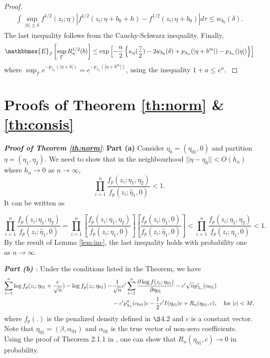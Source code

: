 \documentclass[11pt]{statsoc}
\begin{document}
\begin{proof}
\begin{align}
\int \sup_{|h|\leq \delta} f^{1/2}(z_i;\eta)| f^{1/2}(z_i;\eta+b_0+h)-f^{1/2}(z_i;\eta+b_0)    |d\tau \leq w_{b_0}(\delta).
\label{eq:lemproof2}
\end{align}
The last inequality follows from the Cauchy-Schwarz inequality.
Finally,
\begin{align*} {\mathbbmss{E}}_{\beta} \left[ \sup_{\Gamma}R_n^{1/2}(b) \right] \leq
\exp\left[-\frac{n}{2}\left\{ \kappa_{\eta}(\frac{\gamma}{2})-2w_{b_0}(\delta)
+p_{\lambda_n}(|\eta+b^m|)-p_{\lambda_n}(|\eta|)\right\} \right]
\end{align*}
where $\sup_{\Gamma} e^{- p_{\lambda_n}(|\eta+b|)}=
e^{-p_{\lambda_n}(|\eta+b^m|)}$, using the inequality $1+a \leq e^a$. {\nobreak \ifvmode \relax \else
      \ifdim\lastskip<1.5em \hskip-\lastskip
      \hskip1.5em plus0em minus0.5em \fi \nobreak
      \vrule height0.75em width0.5em depth0.25em\fi}
\end{proof}

\section{Proofs of Theorem \ref{th:norm} \& \ref{th:consis} }
\textbf{\it{Proof of Theorem \ref{th:norm}}}: 
\textbf{Part (a)} Consider $\eta_0=(\eta_{01},0)$ and partition $\eta=(\eta_1,\eta_2)$. We need to show that in the neighbourhood $||\eta-\eta_0||<O( h_n)$ where $h_n \rightarrow 0$ as $n \rightarrow \infty$,
\[
\prod_{i=1}^n \frac{f_p(z_i;\eta_1,\eta_2)}{f_p(z_i;\widehat \eta_1,0)} <1.
\]
It can be written as

\[
\prod_{i=1}^n \frac{f_p(z_i;\eta_1,\eta_2)}{f_p(z_i;\widehat \eta_1,0)} = \prod_{i=1}^n \left[\frac{f_p(z_i;\eta_1,\eta_2)}{f_p(z_i; \eta_1,0)} \right]\left[\frac{f_p(z_i;\eta_1,0)}{f_p(z_i;\widehat \eta_1,0)} \right]<\prod_{i=1}^n \frac{f_p(z_i;\eta_1,\eta_2)}{f_p(z_i; \eta_1,0)} <1.
\]
By the result of Lemma \ref{lem:inc}, the last inequality holds with
probability one as $n \rightarrow \infty$.

\textbf{\it{Part (b) }}: Under the conditions listed in the Theorem, we have
\begin{align*}
\sum_{i=1}^n \log f_p(z_i; \eta_{01}+\frac{c}{\sqrt n}) - \log f_p(z_i; \eta_{01}) =& \frac{1}{\sqrt n}  c' \sum_{i=1}^n \frac{\partial \log f(z_i; \eta_{01})}{\partial \eta_{01}} - c' \sqrt np'_{\lambda_n}(\alpha_{01}) \\
&-c' p''_{\lambda_n}(\alpha_{01}) c     - \frac{1}{2} c'I(\eta_{01})c + R_n(\eta_{01},c), \hspace{.1in} \text{ for $|c|<M$},
\end{align*}
where $f_p(.)$ is the penalized density defined in $\S$4.2 and $c$ is a constant vector. Note that $\eta_{01}=(\beta,\alpha_{01})$ and $\alpha_{01}$ is the true vector of
non-zero coefficients. Using the proof of Theorem 2.1.1 in \cite{ibragimov1981statistical}, one can show that $R_n(\eta_{01},c)\rightarrow 0$ in probability.  
\end{document}
